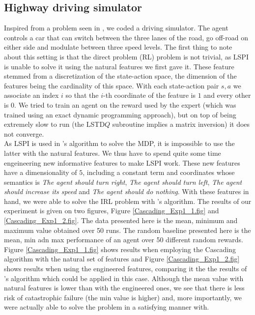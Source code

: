 \documentclass{llncs}
\newcommand{\0}{\mathbf{0}}
\newcommand{\1}{\mathbf{1}}
\begin{document}
\subsection{Highway driving simulator}
Inspired from a problem seen in \cite{syed2008apprenticeship,syed2008game}, we coded a driving simulator. The agent controls a car that can switch between the three lanes of the road, go off-road on either side and modulate between three speed levels. The first thing to note about this setting is that the direct problem (RL) problem is not trivial, as LSPI is unable to solve it using the natural features we first gave it. These feature stemmed from a discretization of the state-action space, the dimension of the features being the cardinality of this space. With each state-action pair $s,a$ we associate an index $i$ so that the $i$-th coordinate of the feature is $1$ and every other is $0$. We tried to train an agent on the reward used by the expert (which was trained using an exact dynamic programming approach), but on top of being extremely slow to run (the LSTD$Q$ subroutine implies a matrix inversion) it does not converge.\\
As LSPI is used in \cite{abbeel2004apprenticeship}'s algorithm to solve the MDP, it is impossible to use the latter with the natural features. We thus have to spend quite some time engeineering new informative features to make LSPI work. These new features have a dimensionality of $5$, including a constant term and coordinates whose semantics is \emph{The agent should turn right}, \emph{The agent should turn left}, \emph{The agent should increase its speed} and \emph{The agent should do nothing}. With these features in hand, we were able to solve the IRL problem with \cite{abbeel2004apprenticeship}'s algorithm. The results of our experiment is given on two figures, Figure \ref{Cascading_Exp1_1.fig} and \ref{Cascading_Exp1_2.fig}. The data presented here is the mean, minimum and maximum value obtained over 50 runs. The random baseline presented here is the mean, min adn max performance of an agent over 50 different random rewards.\\
Figure \ref{Cascading_Exp1_1.fig} shows results when employing the Cascading algorithm with the natural set of features and Figure \ref{Cascading_Exp1_2.fig} shows results when using the engineered features, comparing it the the results of \cite{abbeel2004apprenticeship}'s algorithm which could be applied in this case. Although the mean value with natural features is lower than with the engineered ones, we see that there is less risk of catastrophic failure (the min value is higher) and, more importantly, we were actually able to solve the problem in a satisfying manner with.
\end{document}
